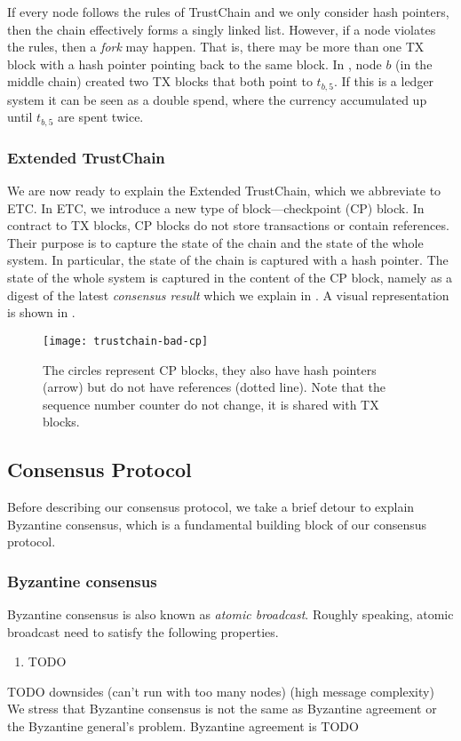 If every node follows the rules of TrustChain and we only consider hash pointers,
then the chain effectively forms a singly linked list.
However, if a node violates the rules, then a \emph{fork} may happen.
That is, there may be more than one TX block with a hash pointer pointing back to the same block.
In , node $b$ (in the middle chain) created two TX blocks that both point to $t_{b, 5}$.
If this is a ledger system it can be seen as a double spend, where the currency accumulated up until $t_{b, 5}$ are spent twice.

\subsubsection*{Extended TrustChain}
We are now ready to explain the Extended TrustChain, which we abbreviate to ETC.
In ETC, we introduce a new type of block---checkpoint (CP) block.
In contract to TX blocks, CP blocks do not store transactions or contain references.
Their purpose is to capture the state of the chain and the state of the whole system.
In particular, the state of the chain is captured with a hash pointer.
The state of the whole system is captured in the content of the CP block,
namely as a digest of the latest \emph{consensus result} which we explain in .
A visual representation is shown in .

\begin{figure}
    \texttt{[image: trustchain-bad-cp]}
    \centering
    \caption{The circles represent CP blocks,
    they also have hash pointers (arrow) but do not have references (dotted line).
    Note that the sequence number counter do not change, it is shared with TX blocks.}
    \label{fig:trustchain-bad-cp}
\end{figure}

\subsection{Consensus Protocol}\label{sec:overview-cons}
Before describing our consensus protocol, we take a brief detour to explain Byzantine consensus,
which is a fundamental building block of our consensus protocol.

\subsubsection*{Byzantine consensus}
Byzantine consensus is also known as \emph{atomic broadcast}.
Roughly speaking, atomic broadcast need to satisfy the following properties.
\begin{enumerate}
\item TODO
\end{enumerate}
TODO downsides (can't run with too many nodes) (high message complexity)
We stress that Byzantine consensus is not the same as Byzantine agreement or the Byzantine general's problem.
Byzantine agreement is TODO

